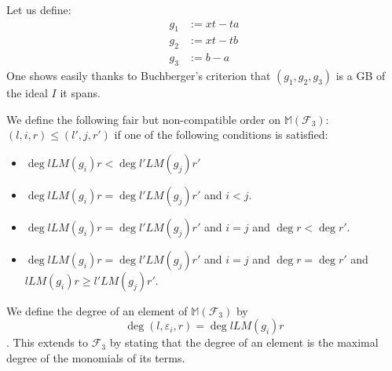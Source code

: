 \documentclass[sigconf]{acmart}
\theoremstyle{plain}
\theoremstyle{definition}
\theoremstyle{remark}
\newcommand{\MM}{\mathbb M}
\newcommand{\LM}{LM}
\begin{document}
Let us define:
\begin{align*}
	g_1 &:= xt - ta \\
	g_2 &:= xt - tb \\
	g_3 &:= b - a
\end{align*}
One shows easily
thanks to Buchberger's criterion
that $(g_1,g_2,g_3)$
is a GB of the ideal $I$ it spans.

We define the following
fair but non-compatible order
on $\MM \left( \mathscr{F}_3 \right):$
  $(l, i, r) \leq (l', j, r')$ if one of the following
  conditions is satisfied:
\begin{itemize}
	\item $\deg{l\LM(g_i)r} < \deg{l'\LM(g_j)r'}$
	\item $\deg{l\LM(g_i)r} = \deg{l'\LM(g_j)r'}$ and $i < j$.
	\item $\deg{l\LM(g_i)r} = \deg{l'\LM(g_j)r'}$ and $i = j$ and $\deg{r} < \deg{r'}$.
	\item $\deg{l\LM(g_i)r} = \deg{l'\LM(g_j)r'}$ and $i = j$ and $\deg{r} = \deg{r'}$ and $l\LM(g_i)r \geq l'\LM(g_j)r'$.
\end{itemize}

We define the 
degree of an element of 
$\MM \left( \mathscr{F}_3 \right)$
by $$\deg{(l, \varepsilon_i, r)} = \deg{l \LM(g_i) r}$$.
This extends to $\mathscr{F}_3$
by stating that the 
degree of 
an element is the maximal
degree of the monomials
of its terms.
\end{document}
